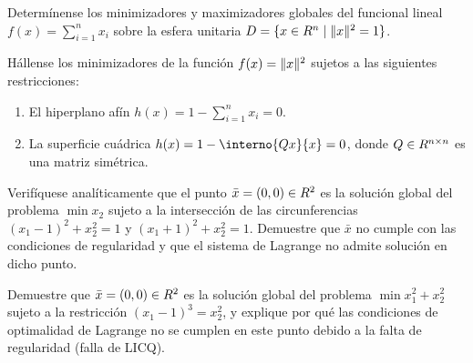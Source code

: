 


\begin{exercise}\label{v1:ejer:2.1}
	Determínense los minimizadores y maximizadores globales del funcional lineal $f(x) = \sum_{i=1}^n x_i$ sobre la esfera unitaria $D = \{ x \in R^n \mid \lVert x\rVert^2 = 1 \}$.
\end{exercise}

\begin{exercise}\label{v1:ejer:2.2}
	Hállense los minimizadores de la función $f(x) = \lVert x\rVert^2$ sujetos a las siguientes restricciones:
	\begin{enumerate}
		\item[(a)] El hiperplano afín $h(x) = 1 - \sum_{i=1}^n x_i = 0$.
		\item[(b)] La superficie cuádrica $h(x) = 1 - \interno{Qx}{x} = 0$, donde $Q \in R^{n \times n}$ es una matriz simétrica.
	\end{enumerate}
\end{exercise}

\begin{exercise}\label{v1:ejer:2.3}
	Verifíquese analíticamente que el punto $\bar{x} = (0,0) \in R^2$ es la solución global del problema $\min x_2$ sujeto a la intersección de las circunferencias $(x_1 - 1)^2 + x_2^2 = 1$ y $(x_1 + 1)^2 + x_2^2 = 1$. Demuestre que $\bar{x}$ no cumple con las condiciones de regularidad y que el sistema de Lagrange no admite solución en dicho punto.
\end{exercise}

\begin{exercise}\label{v1:ejer:2.4}
	Demuestre que $\bar{x} = (0,0) \in R^2$ es la solución global del problema $\min x_1^2 + x_2^2$ sujeto a la restricción $(x_1 - 1)^3 = x_2^2$, y explique por qué las condiciones de optimalidad de Lagrange no se cumplen en este punto debido a la falta de regularidad (falla de LICQ).
\end{exercise}

